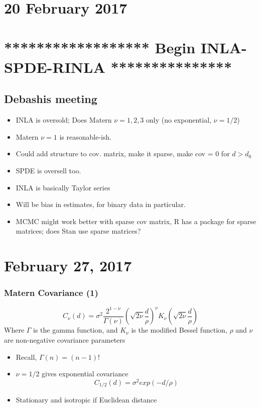 \documentclass{article}
\begin{document}
\section*{20 February 2017}

\section*{****************** Begin INLA-SPDE-RINLA ***************}

\subsection*{Debashis meeting}
\begin{itemize}
\item INLA is oversold; Does Matern $\nu = 1, 2, 3$ only (no exponential, $\nu = 1/2$)
\item Matern $\nu = 1$ is reasonable-ish.
\item Could add structure to cov. matrix, make it sparse, make cov = 0 for $d > d_{0}$
\item SPDE is oversell too.
\item INLA is basically Taylor series
\item Will be bias in estimates, for binary data in particular.
\item MCMC might work better with sparse cov matrix, R has a package for sparse matrices; does Stan use sparse matrices?
\end{itemize}

\section*{February 27, 2017}

\subsubsection*{Matern Covariance (1)}
$$ C_{\nu}(d) = \sigma^{2} \frac{2^{1 - \nu}}{\Gamma(\nu)} \left( \sqrt{2 \nu} \frac{d}{\rho} \right)^{\nu} K_{\nu} \left( \sqrt{2\nu}\frac{d}{\rho} \right) $$
Where $\Gamma$ is the gamma function, and $K_{\nu}$ is the modified Bessel function, $\rho$ and $\nu$ are non-negative covariance parameters
\begin{itemize}
\item Recall, $\Gamma(n) = (n-1)!$
\item $\nu = 1/2$ gives exponential covariance 
$$C_{1/2}(d) = \sigma^{2} exp(-d/\rho)$$
\item Stationary and isotropic if Euclidean distance
\end{itemize}
\end{document}

